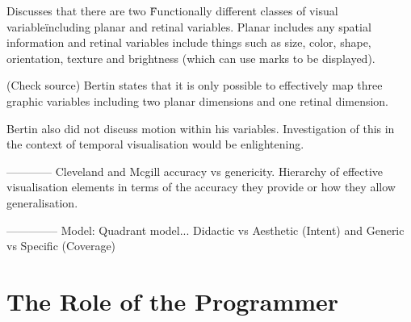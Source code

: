 Discusses that there are two \"Functionally different classes of visual variable\" including planar and retinal variables. Planar includes any spatial information and retinal variables include things such as size, color, shape, orientation, texture and brightness (which can use marks to be displayed).

(Check source) Bertin states that it is only possible to effectively map three graphic variables including two planar dimensions and one retinal dimension.

Bertin also did not discuss motion within his variables. Investigation of this in the context of temporal visualisation would be enlightening.

------------
Cleveland and Mcgill accuracy vs genericity. Hierarchy of effective visualisation elements in terms of the accuracy they provide or how they allow generalisation.

--------------
Model:
Quadrant model...
Didactic vs Aesthetic (Intent) and Generic vs Specific (Coverage)

\section{The Role of the Programmer}

